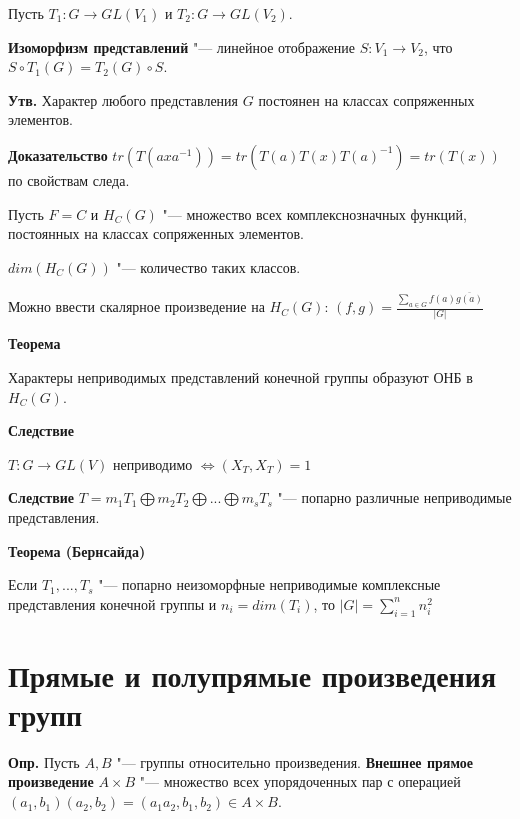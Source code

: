 \documentclass{article}
\begin{document}
Пусть $T_1: G \rightarrow GL(V_1)$ и $T_2: G \rightarrow GL(V_2)$.

\textbf{Изоморфизм представлений} "--- линейное отображение $S: V_1 \rightarrow V_2$, что $S \circ T_1(G) = T_2(G) \circ S$.

\vspace{10pt}

\textbf{Утв.}
Характер любого представления $G$ постоянен на классах сопряженных элементов.

\vspace{5pt}

\textbf{Доказательство}
$tr(T(axa^{-1})) = tr(T(a)T(x)T(a)^{-1}) = tr(T(x))$ по свойствам следа.

\vspace{10pt}

Пусть $F = C$ и $H_C(G)$ "--- множество всех комплекснозначных функций, постоянных на классах сопряженных элементов.

$dim(H_C(G))$ "--- количество таких классов.

Можно ввести скалярное произведение на $H_C(G)$: $(f, g) = \frac{\sum \limits_{a \in G} f(a)\overline{g(a)}}{|G|}$

\vspace{10pt}

\textbf{Теорема}

Характеры неприводимых представлений конечной группы образуют ОНБ в $H_C(G)$.

\textbf{Следствие}

$T: G \rightarrow GL(V)$ неприводимо $\Leftrightarrow (X_T, X_T) = 1$

\vspace{10pt}

\textbf{Следствие}
$T = m_1T_1 \bigoplus m_2T_2 \bigoplus ... \bigoplus m_sT_s$ "--- попарно различные неприводимые представления.

\vspace{10pt}

\textbf{Теорема (Бернсайда)}

Если $T_1 , ... , T_s$ "--- попарно неизоморфные неприводимые комплексные представления конечной группы и $n_i = dim(T_i)$, то $|G| = \sum \limits_{i = 1}^n n_i^2$

\section{Прямые и полупрямые произведения групп}

\textbf{Опр.} Пусть $A, B$ "--- группы относительно произведения. \textbf{Внешнее прямое произведение} $A \times B$ "--- множество всех упорядоченных пар с операцией $(a_1, b_1)(a_2, b_2) = (a_1a_2, b_1, b_2) \in A \times B$.
\end{document}
